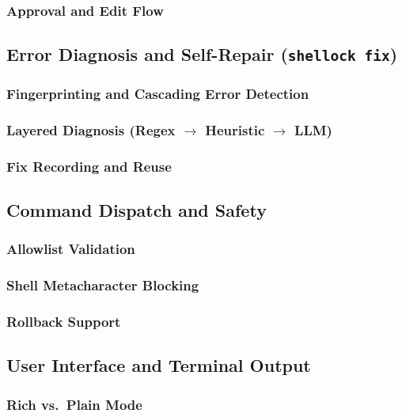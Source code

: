 \documentclass[12pt,a4paper]{article}
\begin{document}
\subsubsection{Approval and Edit Flow}

\subsection{Error Diagnosis and Self-Repair (\texttt{shellock fix})}

\subsubsection{Fingerprinting and Cascading Error Detection}

\subsubsection{Layered Diagnosis (Regex $\to$ Heuristic $\to$ LLM)}

\subsubsection{Fix Recording and Reuse}

\subsection{Command Dispatch and Safety}

\subsubsection{Allowlist Validation}

\subsubsection{Shell Metacharacter Blocking}

\subsubsection{Rollback Support}

\subsection{User Interface and Terminal Output}

\subsubsection{Rich vs.\ Plain Mode}
\end{document}
